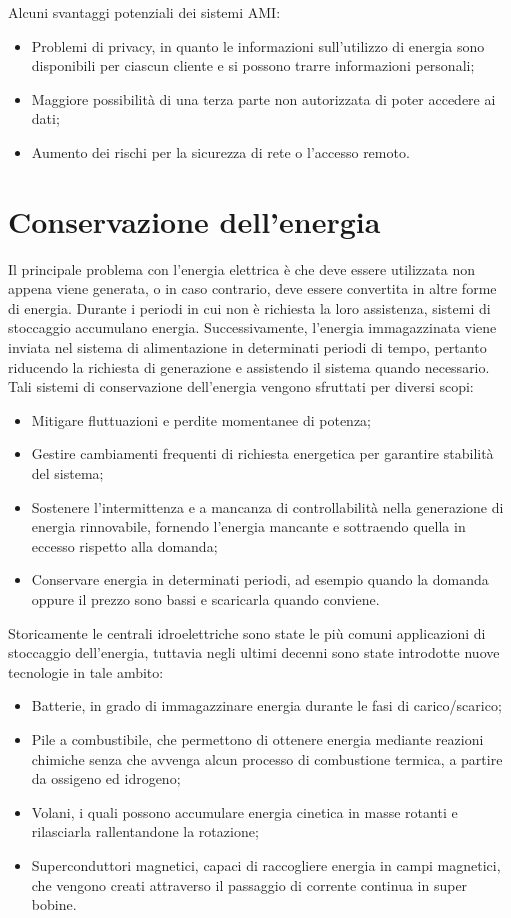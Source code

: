 Alcuni svantaggi potenziali dei sistemi AMI:
\begin{itemize}
	\item Problemi di privacy, in quanto le informazioni sull'utilizzo di energia sono disponibili per ciascun cliente e si possono trarre informazioni personali;
	\item Maggiore possibilità di una terza parte non autorizzata di poter accedere ai dati;
	\item Aumento dei rischi per la sicurezza di rete o l'accesso remoto.
\end{itemize}
 
\section{Conservazione dell'energia}
Il principale problema con l'energia elettrica è che deve essere utilizzata non appena viene generata, o in caso contrario, deve essere convertita in altre forme di energia. Durante i periodi in cui non è richiesta la loro assistenza, sistemi di stoccaggio accumulano energia. Successivamente, l'energia immagazzinata viene inviata nel sistema di alimentazione in determinati periodi di tempo, pertanto
riducendo la richiesta di generazione e assistendo il sistema quando necessario. 
Tali sistemi di conservazione dell'energia vengono sfruttati per diversi scopi:
\begin{itemize}
	\item Mitigare fluttuazioni e perdite momentanee di potenza;
	\item Gestire cambiamenti frequenti di richiesta energetica per garantire stabilità del sistema; 
	\item Sostenere l'intermittenza e a mancanza di controllabilità nella generazione di energia rinnovabile, fornendo l'energia mancante e sottraendo quella in eccesso rispetto alla domanda;
	\item Conservare energia in determinati periodi, ad esempio quando la domanda oppure il prezzo sono bassi e scaricarla quando conviene.
\end{itemize}

Storicamente le centrali idroelettriche sono state le più comuni applicazioni di stoccaggio dell'energia, tuttavia negli ultimi decenni sono state introdotte nuove tecnologie in tale ambito:
\begin{itemize}
	\item Batterie, in grado di immagazzinare energia durante le fasi di carico/scarico;
	\item Pile a combustibile, che permettono di ottenere energia mediante reazioni chimiche senza che avvenga alcun processo di combustione termica, a partire da ossigeno ed idrogeno;
	\item Volani, i quali possono accumulare energia cinetica in masse rotanti e rilasciarla rallentandone la rotazione;
	\item Superconduttori magnetici, capaci  di raccogliere energia in campi magnetici, che vengono creati attraverso il passaggio di corrente continua in super bobine.  
\end{itemize}

